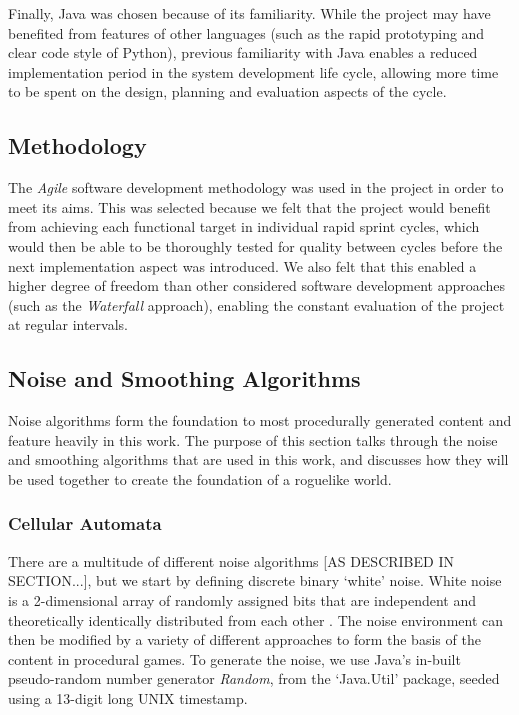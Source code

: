 \documentclass[12pt,a4paper]{article}
\begin{document}
Finally, Java was chosen because of its familiarity. While the project may have benefited from features of other languages (such as the rapid prototyping and clear code style of Python), previous familiarity with Java enables a reduced implementation period in the system development life cycle, allowing more time to be spent on the design, planning and evaluation aspects of the cycle. 


\subsection{Methodology}

The \emph{Agile} software development methodology was used in the project in order to meet its aims. This was selected because we felt that the project would benefit from achieving each functional target in individual rapid sprint cycles, which would then be able to be thoroughly tested for quality between cycles before the next implementation aspect was introduced. We also felt that this enabled a higher degree of freedom than other considered software development approaches (such as the \emph{Waterfall} approach), enabling the constant evaluation of the project at regular intervals.

\subsection{Noise and Smoothing Algorithms}

Noise algorithms form the foundation to most procedurally generated content and feature heavily in this work. The purpose of this section talks through the noise and smoothing algorithms that are used in this work, and discusses how they will be used together to create the foundation of a roguelike world. 


\subsubsection{Cellular Automata}

There are a multitude of different noise algorithms [AS DESCRIBED IN SECTION...], but we start by defining discrete binary `white' noise. White noise is a 2-dimensional array of randomly assigned bits that are independent and theoretically identically distributed from each other \cite{stats}. The noise environment can then be modified by a variety of different approaches to form the basis of the content in procedural games. To generate the noise, we use Java's in-built pseudo-random number generator \emph{Random}, from the `Java.Util' package, seeded using a 13-digit long UNIX timestamp.
\end{document}
